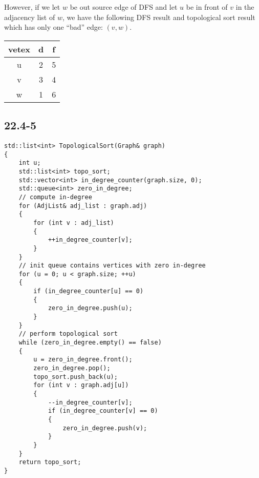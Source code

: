 
However, if we let $w$ be out source edge of DFS and 
let $u$ be in front of $v$ in the adjacency list of $w$,
we have the following DFS result and topological sort result
which has only one ``bad'' edge: $(v, w)$.

\begin{tabular}{c|c|c}
    vetex & d & f \\
    \hline
    u & 2 & 5 \\
    v & 3 & 4 \\
    w & 1 & 6 \\
\end{tabular}


\subsection*{22.4-5}

\begin{verbatim}
std::list<int> TopologicalSort(Graph& graph)
{
    int u;
    std::list<int> topo_sort;
    std::vector<int> in_degree_counter(graph.size, 0);
    std::queue<int> zero_in_degree;
    // compute in-degree
    for (AdjList& adj_list : graph.adj)
    {
        for (int v : adj_list)
        {
            ++in_degree_counter[v];
        }
    }
    // init queue contains vertices with zero in-degree
    for (u = 0; u < graph.size; ++u)
    {
        if (in_degree_counter[u] == 0)
        {
            zero_in_degree.push(u);
        }
    }
    // perform topological sort
    while (zero_in_degree.empty() == false)
    {
        u = zero_in_degree.front();
        zero_in_degree.pop();
        topo_sort.push_back(u);
        for (int v : graph.adj[u])
        {
            --in_degree_counter[v];
            if (in_degree_counter[v] == 0)
            {
                zero_in_degree.push(v);
            }
        }
    }
    return topo_sort;
}
\end{verbatim}


